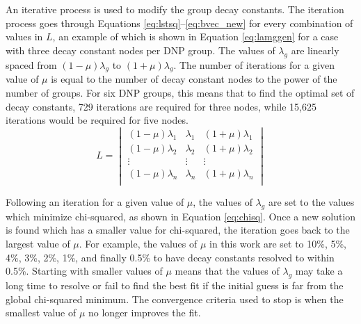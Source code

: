 \documentclass{style/nseJournal}
\begin{document}
An iterative process is used to modify the group decay constants.
The iteration process goes through Equations \eqref{eq:lstsq}--\eqref{eq:bvec_new} for every combination of values in $L$, an example of which is shown in Equation \eqref{eq:lamggen} for a case with three decay constant nodes per DNP group.
The values of $\lambda_g$ are linearly spaced from $\left(1 - \mu \right) \lambda_g$ to  $\left(1 + \mu \right) \lambda_g$.
The number of iterations for a given value of $\mu$ is equal to the number of decay constant nodes to the power of the number of groups.
For six DNP groups, this means that to find the optimal set of decay constants, 729 iterations are required for three nodes, while 15,625 iterations would be required for five nodes.
\begin{equation}
    L = 
\begin{vmatrix}
\left(1 - \mu \right) \lambda_1 & \lambda_1 & \left(1 + \mu \right) \lambda_1\\
\left(1 - \mu \right) \lambda_2 & \lambda_2 & \left(1 + \mu \right) \lambda_2\\
\vdots                       & \vdots       &  \vdots                      \\
\left(1 - \mu \right) \lambda_n & \lambda_n & \left(1 + \mu \right) \lambda_n\\
\end{vmatrix}
    \label{eq:lamggen}
\end{equation}

Following an iteration for a given value of $\mu$, the values of $\lambda_g$ are set to the values which minimize chi-squared, as shown in Equation \eqref{eq:chisq}.
Once a new solution is found which has a smaller value for chi-squared, the iteration goes back to the largest value of $\mu$.
For example, the values of $\mu$ in this work are set to 10\%, 5\%, 4\%, 3\%, 2\%, 1\%, and finally 0.5\% to have decay constants resolved to within 0.5\%.
Starting with smaller values of $\mu$ means that the values of $\lambda_g$ may take a long time to resolve or fail to find the best fit if the initial guess is far from the global chi-squared minimum.
The convergence criteria used to stop is when the smallest value of $\mu$ no longer improves the fit.
\end{document}
